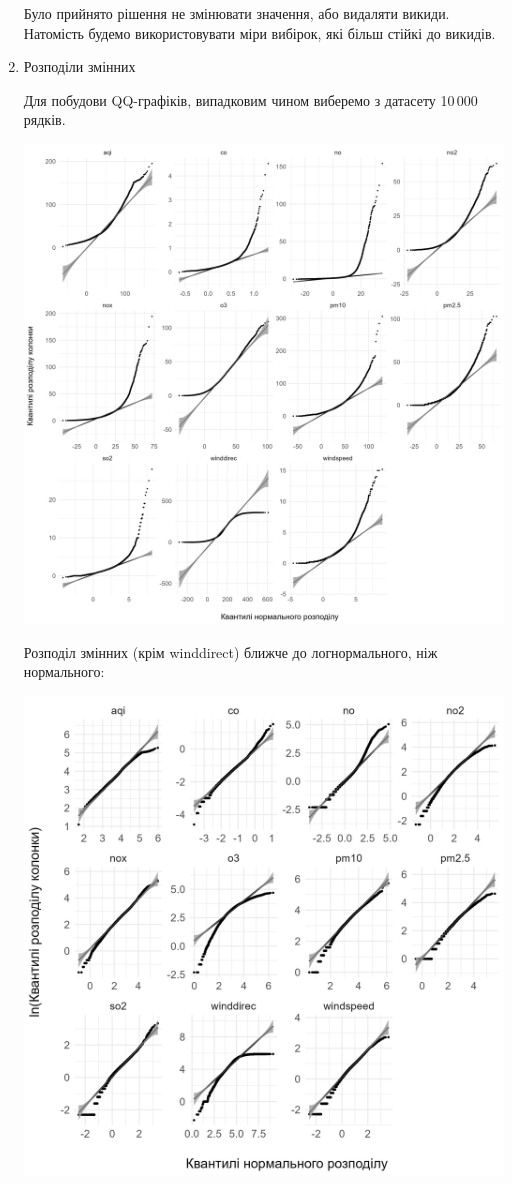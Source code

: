 \documentclass{article}
\begin{document}
\begin{enumerate}
    Було прийнято рішення не змінювати значення, або видаляти викиди. Натомість будемо
    використовувати міри вибірок, які більш стійкі до викидів. 

    \pagebreak

    \item Розподіли змінних

    Для побудови QQ-графіків, випадковим чином виберемо з датасету 10\,000 рядків.

    \includegraphics[width=5.5in]{qq_tidy/qq.png}

    \pagebreak
    
    Розподіл змінних (крім winddirect) ближче до логнормального, ніж нормального:

    \includegraphics[width=6in]{qq_tidy/qq-log.png}
    

\end{enumerate}
\end{document}
